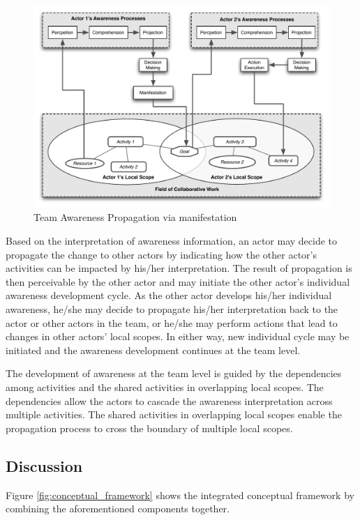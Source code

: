 \begin{figure}[htbp] %
   \centering
   \includegraphics[width=5in]{team_processes_manifestation.pdf} 
   \caption{Team Awareness Propagation via manifestation}
   \label{fig:team_processes_manifestation}
\end{figure}

Based on the interpretation of awareness information, an actor may decide to propagate the change to other actors by indicating how the other actor's activities can be impacted by his/her interpretation. The result of propagation is then perceivable by the other actor and may initiate the other actor's individual awareness development cycle. As the other actor develops his/her individual awareness, he/she may decide to propagate his/her interpretation back to the actor or other actors in the team, or he/she may perform actions that lead to changes in other actors' local scopes. In either way, new individual cycle may be initiated and the awareness development continues at the team level.

The development of awareness at the team level is guided by the dependencies among activities and the shared activities in overlapping local scopes. The dependencies allow the actors to cascade the awareness interpretation across multiple activities. The shared activities in overlapping local scopes enable the propagation process to cross the boundary of multiple local scopes.

\subsection{Discussion} %
\label{sub:discussion}
Figure \ref{fig:conceptual_framework} shows the integrated conceptual framework by combining the aforementioned components together.


